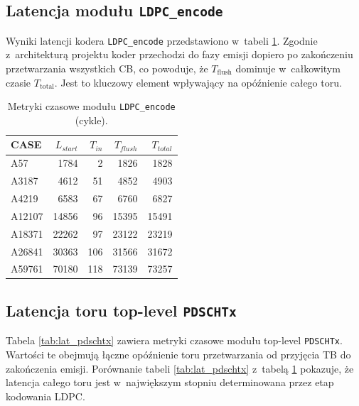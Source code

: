 \subsection{Latencja modułu \texttt{LDPC\_encode}}
\label{subsec:lat_ldpc_encode}

Wyniki latencji kodera \texttt{LDPC\_encode} przedstawiono w~tabeli \ref{tab:lat_ldpc_encode}.
Zgodnie z~architekturą projektu koder przechodzi do fazy emisji dopiero po zakończeniu przetwarzania wszystkich CB,
co powoduje, że $T_{\mathrm{flush}}$ dominuje w~całkowitym czasie $T_{\mathrm{total}}$.
Jest to kluczowy element wpływający na opóźnienie całego toru.


\begin{table}[!ht]
\centering
\caption{Metryki czasowe modułu \texttt{LDPC\_encode} (cykle).}
\label{tab:lat_ldpc_encode}
\begin{tabular}{lrrrr}
\hline
CASE & $L_{start}$ & $T_{in}$ & $T_{flush}$ & $T_{total}$ \\
\hline
A57     & 1784  & 2   & 1826  & 1828 \\
A3187   & 4612  & 51  & 4852  & 4903 \\
A4219   & 6583  & 67  & 6760  & 6827 \\
A12107  & 14856 & 96  & 15395 & 15491 \\
A18371  & 22262 & 97  & 23122 & 23219 \\
A26841  & 30363 & 106 & 31566 & 31672 \\
A59761  & 70180 & 118 & 73139 & 73257 \\
\hline
\end{tabular}
\end{table}

\subsection{Latencja toru top-level \texttt{PDSCHTx}}
\label{subsec:lat_pdschtx}

Tabela \ref{tab:lat_pdschtx} zawiera metryki czasowe modułu top-level \texttt{PDSCHTx}.
Wartości te obejmują łączne opóźnienie toru przetwarzania od przyjęcia TB do zakończenia emisji.
Porównanie tabeli \ref{tab:lat_pdschtx} z~tabelą \ref{tab:lat_ldpc_encode} pokazuje,
że latencja całego toru jest w~największym stopniu determinowana przez etap kodowania LDPC.


